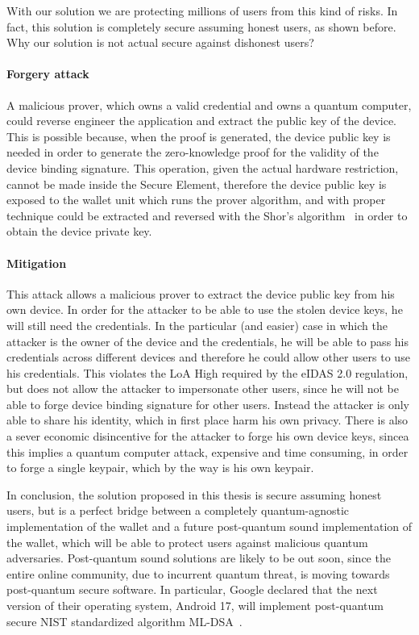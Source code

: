 \documentclass[binding=0.6cm,oneside,noexaminfo]{sapthesis}
\begin{document}
With our solution we are protecting millions of users from this kind of risks. In fact, this solution is completely
secure assuming honest users, as shown before.
Why our solution is not actual secure against dishonest users?

\paragraph{Forgery attack}
A malicious prover, which owns a valid credential and owns a quantum computer, could reverse engineer the application
and extract the public key of the device. This is possible because, when the proof is generated, the device public key
is needed in order to generate the zero-knowledge proof for the validity of the device binding signature. This operation,
given the actual hardware restriction, cannot be made inside the Secure Element, therefore the device public key is
exposed to the wallet unit which runs the prover algorithm, and with proper technique could be extracted and reversed
with the Shor's algorithm~\cite{Shor1997Polynomial} in order to obtain the device private key.

\paragraph{Mitigation}
This attack allows a malicious prover to extract the device public key from his own device.
In order for the attacker to be able to use the stolen device keys, he will still need the credentials.
In the particular (and easier) case in which the attacker is the owner of the device and the credentials,
he will be able to pass his credentials across different devices and therefore he could allow other
users to use his credentials. This violates the LoA High required by the eIDAS 2.0 regulation, but does
not allow the attacker to impersonate other users, since he will not be able to forge device binding signature
for other users. Instead the attacker is only able to share his identity, which in first place harm his own
privacy. There is also a sever economic disincentive for the attacker to forge his own device keys, sincea 
this implies a quantum computer attack, expensive and time consuming, in order to forge a single keypair,
which by the way is his own keypair.

In conclusion, the solution proposed in this thesis is secure assuming honest users,
but is a perfect bridge between a completely quantum-agnostic implementation of the wallet and a future
post-quantum sound implementation of the wallet, which will be able to protect users against malicious quantum adversaries.
Post-quantum sound solutions are likely to be out soon, since the entire online community, due to incurrent quantum
threat, is moving towards post-quantum secure software. In particular, Google declared that the next version
of their operating system, Android 17, will implement post-quantum secure NIST standardized algorithm 
ML-DSA~\cite{Google2026SecurityQuantumAndroid}.
\end{document}
